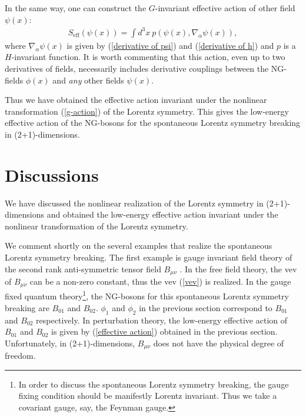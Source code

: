 \documentclass[a4paper,12pt]{article}
\begin{document}
In the same way, one can construct the $G$-invariant effective action
of other field $\psi(x)$: 
\begin{eqnarray}
S_{\textrm{eff}}(\psi(x)) = \int d^3 x~p \left(\psi(x),
\nabla_{\alpha} \psi(x) \right), \label{effective action of psi}
\end{eqnarray}    
where $\nabla_{\alpha} \psi(x)$ is given by (\ref{derivative of psi}) 
and (\ref{derivative of h}) and $p$ is a $H$-invariant function.
It is worth commenting that this action, even up to two derivatives of
fields, necessarily includes derivative couplings 
between the NG-fields $\phi(x)$ and \textit{any} other fields $\psi(x)$. 

Thus we have obtained the effective action invariant under the
nonlinear transformation (\ref{g-action}) of the Lorentz symmetry.
This gives the low-energy effective action of the NG-bosons for the 
spontaneous Lorentz symmetry breaking in (2+1)-dimensions.

\section{Discussions}
We have discussed the nonlinear realization of the Lorentz symmetry in 
(2+1)-dimensions and obtained the low-energy effective action 
invariant under the nonlinear transformation of the Lorentz symmetry.    

We comment shortly on the several examples that realize the 
spontaneous Lorentz symmetry breaking. The first example is gauge 
invariant field theory of the second rank anti-symmetric tensor 
field $B_{\mu \nu}$ \cite{Townsend, Kimura}.
In the free field theory, the vev of $B_{\mu \nu}$ can be
a non-zero constant, thus the vev (\ref{vev}) is realized. 
In the gauge fixed quantum theory\footnote{In order to discuss the spontaneous
Lorentz symmetry breaking, the gauge fixing condition should be
manifestly Lorentz invariant. Thus we take a covariant gauge, say,
the Feynman gauge.},
the NG-bosons for this spontaneous Lorentz symmetry breaking 
are $B_{01}$ and $B_{02}$. 
$\phi_{1}$ and $\phi_{2}$ in the previous section correspond to $B_{01}$ 
and $B_{02}$ respectively.
In perturbation theory, 
the low-energy effective action of 
$B_{01}$ and $B_{02}$
is given by
(\ref{effective action}) obtained in 
the previous section.
Unfortunately, in (2+1)-dimensions, $B_{\mu \nu}$ does not have the 
physical degree of freedom. 
\end{document}
